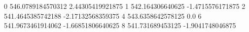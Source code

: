 0 546.0789184570312 2.44305419921875
1 542.164306640625 -1.4715576171875
2 541.4645385742188 -2.17132568359375
4 543.6358642578125 0.0
6 541.9673461914062 -1.66851806640625
8 541.731689453125 -1.9041748046875
